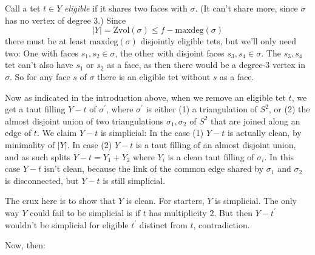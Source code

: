 \documentclass[12pt]{article}
\newcommand{\kw}{\mathrm}
\newcommand{\maxdeg}{\kw{maxdeg}}
\newcommand{\Zvol}{\kw{Zvol}}
\begin{document}
Call a tet $t \in Y$ \emph{eligible} if it shares two faces 
with $\sigma$. (It can't share more, since $\sigma$ has no vertex of
degree $3$.)
Since
\[
|Y| = \Zvol(\sigma) \leq f-\maxdeg(\sigma) 
\]
there must be at least $\maxdeg(\sigma)$ disjointly eligible tets,
but we'll only need two:
One with faces $s_1,s_2 \in \sigma$,
the other with disjoint faces $s_3,s_4 \in \sigma$.
The $s_3,s_4$ tet can't also have $s_1$ or $s_2$ as a face,
as then there would be a degree-$3$  vertex in $\sigma$.
So for any face $s$ of $\sigma$
there is an eligible tet without $s$ as a face.

Now as indicated in the introduction above, 
when we remove an eligible tet $t$,
we get a taut filling $Y-t$ of
$\sigma^\prime$,
where $\sigma^\prime$ is either (1) a triangulation of $S^2$,
or (2) the almost disjoint union of
two triangulations $\sigma_1,\sigma_2$ of $S^2$
that are joined along an edge of $t$.
We claim $Y-t$ is simplicial:
In the case (1)
$Y-t$ is actually clean,
by minimality of $|Y|$.
In case (2)
$Y-t$ is a taut filling of an almost disjoint union,
and as such splits $Y-t=Y_1+Y_2$ where $Y_i$ is
a clean taut filling of $\sigma_i$.
In this case $Y-t$ isn't clean, because the link of the common
edge shared by $\sigma_1$ and $\sigma_2$ is disconnected,
but $Y-t$ is still simplicial.

The crux here is to show that $Y$ is clean.
For starters, $Y$ is simplicial.
The only way $Y$ could fail to be simplicial is if $t$ has multiplicity
$2$.
But then $Y-t^\prime$ wouldn't be simplicial for eligible $t^\prime$
distinct from $t$,
contradiction.

Now, then:
\end{document}
